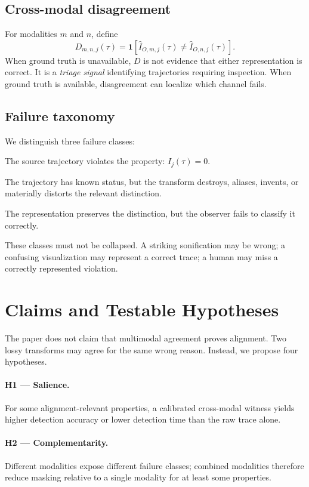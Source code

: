 \documentclass[11pt]{article}
\newcommand{\one}{\mathbf{1}}
\begin{document}
\subsection{Cross-modal disagreement}
For modalities $m$ and $n$, define
\begin{equation}
D_{m,n,j}(\tau)
=
\one\!\left[
\widehat I_{O,m,j}(\tau)
\neq
\widehat I_{O,n,j}(\tau)
\right].
\end{equation}
When ground truth is unavailable, $D$ is not evidence that either representation is correct. It is a \emph{triage signal} identifying trajectories requiring inspection. When ground truth is available, disagreement can localize which channel fails.

\subsection{Failure taxonomy}
We distinguish three failure classes:
\begin{description}[style=nextline]
    \item[Agent failure.] The source trajectory violates the property: $I_j(\tau)=0$.
    \item[Mapping failure.] The trajectory has known status, but the transform destroys, aliases, invents, or materially distorts the relevant distinction.
    \item[Observer failure.] The representation preserves the distinction, but the observer fails to classify it correctly.
\end{description}
These classes must not be collapsed. A striking sonification may be wrong; a confusing visualization may represent a correct trace; a human may miss a correctly represented violation.

\section{Claims and Testable Hypotheses}
The paper does not claim that multimodal agreement proves alignment. Two lossy transforms may agree for the same wrong reason. Instead, we propose four hypotheses.

\paragraph{H1 --- Salience.}
For some alignment-relevant properties, a calibrated cross-modal witness yields higher detection accuracy or lower detection time than the raw trace alone.

\paragraph{H2 --- Complementarity.}
Different modalities expose different failure classes; combined modalities therefore reduce masking relative to a single modality for at least some properties.
\end{document}
